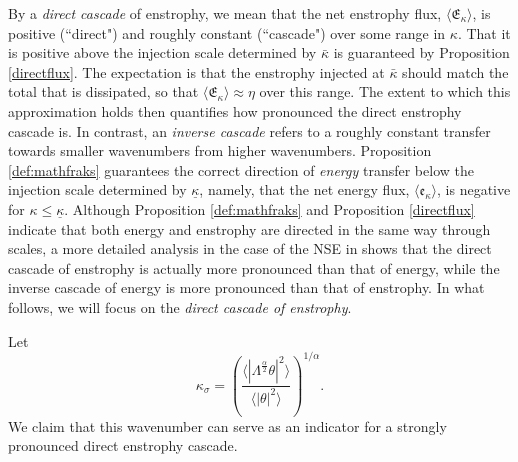 \documentclass[twoside, reqno]{amsart}
\numberwithin{lemma}{section}
\numberwithin{theorem}{section}
\numberwithin{proposition}{section}
\numberwithin{equation}{section} %
\newcommand{\te}{\theta}
\newcommand{\ga}{\gamma}
\newcommand{\la}{\Lambda}
\newcommand{\E}{\mathfrak{E}}
\newcommand{\bkap}{\bar{\kap}}
\newcommand{\kapb}{\underline{\kap}}
\newcommand{\kap}{\kappa}
\newcommand{\lb}{\langle}
\newcommand{\rb}{\rangle}
\begin{document}

By a \textit{direct cascade} of enstrophy, we mean that {the net enstrophy flux}, $\langle \E_\kappa \rangle$, is positive {(``direct")} and roughly constant {(``cascade")}  over some range in $\kappa$.  That it is positive {above the injection scale determined by $\bkap$} is guaranteed  by Proposition \ref{directflux}.  The expectation is that the enstrophy injected at $\bar\kappa$ should match the total that is dissipated, so that  $\langle \E_\kappa \rangle\approx \eta$ over this range.  The extent to which this approximation holds then quantifies how pronounced the direct enstrophy cascade is.  In contrast, an {\it inverse cascade} refers to a {roughly constant} transfer {towards} smaller wavenumbers {from higher wavenumbers. Proposition \ref{def:mathfraks} guarantees the correct direction of \textit{energy} transfer below the injection scale determined by $\kapb$, namely, that the net energy flux, $\lb \mathfrak{e}_\kap\rb$, is negative for $\kap\leq\kapb$.}
{Although Proposition \ref{def:mathfraks} and Proposition \ref{directflux} indicate that both} energy and enstrophy {are directed in the same way through scales}, a more detailed analysis in the case of the NSE in \cite{FJMR2002} shows that the direct cascade of enstrophy is {actually} more pronounced than that of energy, {while} the inverse cascade {of energy is more pronounced than that of enstrophy. In what follows, we will focus} on the \textit{direct cascade of enstrophy}.   

Let
\begin{equation} \label{def:ksigma}
    \kappa_{\sigma} = \left(\frac{\langle|\la^{\frac{\alpha}{2}}\te|^2\rangle}{\langle|\te|^2\rangle}\right)^ {1/\alpha} .
\end{equation}
{We claim that this} wavenumber can serve as an indicator for a strongly pronounced direct enstrophy cascade.  
\end{document}
